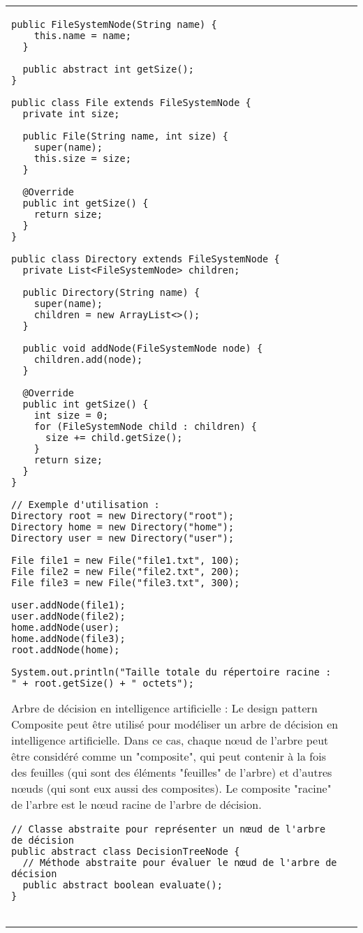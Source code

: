 \begin{table}[H]
\begin{adjustbox}{max width=\textwidth}
\begin{tabular}{l|p{\textwidth}}
\begin{minipage}[tl]{0.5\textwidth}
\begin{minipage}[b]{1\textwidth}
\begin{lstlisting}[style=monstyle]
  public FileSystemNode(String name) {
    this.name = name;
  }

  public abstract int getSize();
}

public class File extends FileSystemNode {
  private int size;

  public File(String name, int size) {
    super(name);
    this.size = size;
  }

  @Override
  public int getSize() {
    return size;
  }
}

public class Directory extends FileSystemNode {
  private List<FileSystemNode> children;

  public Directory(String name) {
    super(name);
    children = new ArrayList<>();
  }

  public void addNode(FileSystemNode node) {
    children.add(node);
  }

  @Override
  public int getSize() {
    int size = 0;
    for (FileSystemNode child : children) {
      size += child.getSize();
    }
    return size;
  }
}

// Exemple d'utilisation :
Directory root = new Directory("root");
Directory home = new Directory("home");
Directory user = new Directory("user");

File file1 = new File("file1.txt", 100);
File file2 = new File("file2.txt", 200);
File file3 = new File("file3.txt", 300);

user.addNode(file1);
user.addNode(file2);
home.addNode(user);
home.addNode(file3);
root.addNode(home);

System.out.println("Taille totale du répertoire racine : " + root.getSize() + " octets");
\end{lstlisting}
\end{minipage}
\end{minipage}
\hspace{6mm}
\begin{minipage}[tr]{0.5\textwidth}
Arbre de décision en intelligence artificielle :
Le design pattern Composite peut être utilisé pour modéliser un arbre de décision en intelligence artificielle. Dans ce cas, chaque nœud de l'arbre peut être considéré comme un "composite", qui peut contenir à la fois des feuilles (qui sont des éléments "feuilles" de l'arbre) et d'autres nœuds (qui sont eux aussi des composites). Le composite "racine" de l'arbre est le nœud racine de l'arbre de décision.
\begin{lstlisting}[style=monstyle]
// Classe abstraite pour représenter un nœud de l'arbre de décision
public abstract class DecisionTreeNode {
  // Méthode abstraite pour évaluer le nœud de l'arbre de décision
  public abstract boolean evaluate();
}


\end{lstlisting}
\end{minipage}
\end{tabular}
\end{adjustbox}
\end{table}
